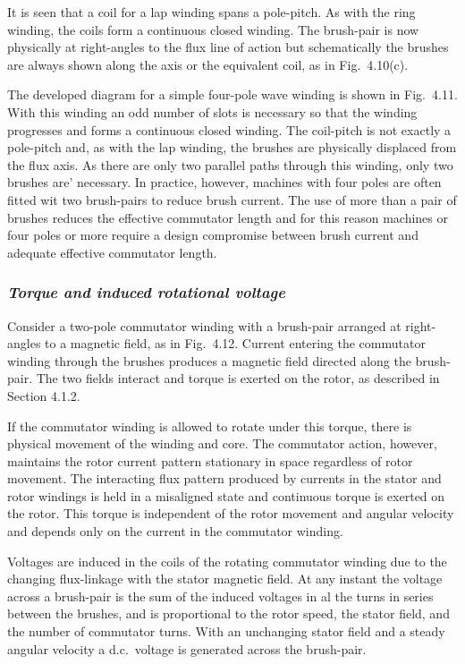 \documentclass[a4paper,numbers=noenddot,12pt]{scrbook}
\begin{document}
It is seen that a coil for a lap winding spans a pole-pitch. As with the ring winding, the coils form a continuous closed winding. The brush-pair is now physically at right-angles to the flux line of action but schematically the brushes are always shown along the axis or the equivalent coil, as in Fig.\ 4.10(c). 

The developed diagram for a simple four-pole wave winding is shown in Fig.\ 4.11. With this winding an odd number of slots is necessary so that the winding progresses and forms a continuous closed winding. The coil-pitch is not exactly a pole-pitch and, as with the lap winding, the brushes are physically displaced from the flux axis. As there are only two parallel paths through this winding, only two brushes are' necessary. In practice, however, machines with four poles are often fitted wit two
brush-pairs to reduce brush current. The use of more than a pair of brushes reduces the effective commutator length and for this reason machines or four poles or more require a design compromise between brush current and adequate effective commutator length. 

\subsubsection{\textit{Torque and induced rotational voltage}}
Consider a two-pole commutator winding with a brush-pair arranged at right-angles to a magnetic field, as in Fig.\ 4.12. Current entering the commutator winding through the brushes produces a magnetic field directed along the brush-pair. The two fields interact and torque is exerted on the rotor, as described in Section 4.1.2. 

If the commutator winding is allowed to rotate under this torque, there is physical movement of the winding and core. The commutator action, however, maintains the rotor current pattern stationary in space regardless of rotor movement. The interacting flux pattern produced by currents in the stator and rotor windings is held in a misaligned state and continuous torque is exerted on the rotor. This torque is independent of the rotor movement and angular velocity and depends only on the current in the commutator winding.

Voltages are induced in the coils of the rotating commutator winding due to the changing flux-linkage with the stator magnetic field. At any instant the voltage across a brush-pair is the sum of the induced voltages in al the turns in series between the brushes, and is proportional to the rotor speed, the stator field, and the number of commutator turns. With an unchanging stator field and a steady angular velocity a d.c.\ voltage is generated across the brush-pair.
\end{document}
